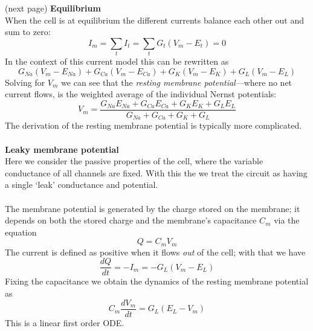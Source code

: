 \documentclass{report}
\begin{document}
(next page)
\newpage
\noindent\textbf{Equilibrium}\\
When the cell is at equilibrium the different currents balance each other out and sum to zero:
\begin{equation*}
I_m=\sum_tI_t=\sum_tG_t(V_m-E_t)=0
\end{equation*}
In the context of this current model this can be rewritten as
\begin{equation*}
G_{Na}(V_m-E_{Na})+G_{Ca}(V_m-E_{Ca})+G_{K}(V_m-E_{K})
+G_{L}(V_m-E_{L})
\end{equation*}
Solving for $V_m$ we can see that the \textit{resting membrane potential}---where no net current flows, is the weighted average of the individual Nernst potentials:
\begin{equation*}
V_m=\frac{G_{Na}E_{Na}+G_{Ca}E_{Ca}+G_{K}E_{K}+G_{L}E_{L}}{G_{Na}+G_{Ca}+G_{K}+G_{L}}
\end{equation*}
The derivation of the resting membrane potential is typically more complicated.\\
\vspace{1mm}\\
\textbf{Leaky membrane potential}\\
Here we consider the passive properties of the cell, where the variable conductance of all channels are fixed. With this the we treat the circuit as having
a single `leak' conductance and potential.\\
\vspace{1mm}\\
The membrane potential is generated by the charge stored on the membrane; it depends on both the stored charge and the membrane's capacitance $C_m$ via the equation
\begin{equation*}
Q=C_mV_m
\end{equation*}
The current is defined as positive when it flows \textit{out} of the cell; with that we have
\begin{equation*}
\frac{dQ}{dt}=-I_m=-G_L(V_m-E_L)
\end{equation*}
Fixing the capacitance we obtain the dynamics of the resting membrane potential as
\begin{equation*}
C_m\frac{dV_m}{dt}=G_L(E_L-V_m)
\end{equation*}
This is a linear first order ODE. 
\newpage
\end{document}
